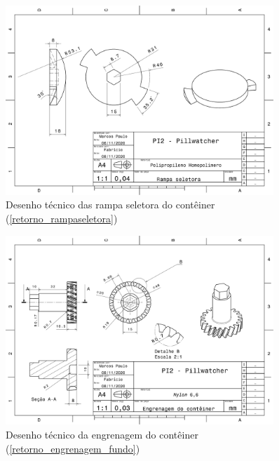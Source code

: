 \begin{apendicesenv}
\begin{figure}[H]
    \centering
    \includegraphics[width=0.9\textwidth]{figuras/estrutura/Desenhos/Rampa_Seletora.pdf}
    \caption{Desenho técnico das rampa seletora do contêiner (\ref{retorno_rampaseletora})}
    \label{fig:rampaseletora}
\end{figure}

\begin{figure}[H]
    \centering
    \includegraphics[width=0.9\textwidth]{figuras/estrutura/Desenhos/Engrenagem_Container.pdf}
    \caption{Desenho técnico da engrenagem do contêiner (\ref{retorno_engrenagem_fundo})}
    \label{fig:engrenagem_fundo}
\end{figure}



\end{apendicesenv}
